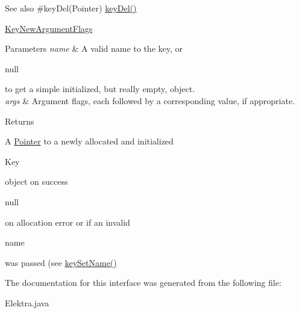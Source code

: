\begin{DoxySeeAlso}{See also}
\#key\+Del(\+Pointer) \hyperlink{group__key_ga3df95bbc2494e3e6703ece5639be5bb1}{key\+Del()} 

\hyperlink{enumorg_1_1libelektra_1_1Elektra_1_1KeyNewArgumentFlags}{Key\+New\+Argument\+Flags}
\end{DoxySeeAlso}

\begin{DoxyParams}{Parameters}
{\em name} & A valid name to the key, or
\begin{DoxyCode}
null 
\end{DoxyCode}
 to get a simple initialized, but really empty, object. \\
\hline
{\em args} & Argument flags, each followed by a corresponding value, if appropriate. \\
\hline
\end{DoxyParams}
\begin{DoxyReturn}{Returns}

\begin{DoxyItemize}
\item A \hyperlink{}{Pointer} to a newly allocated and initialized
\begin{DoxyCode}
Key 
\end{DoxyCode}
 object on success 
\item 
\begin{DoxyCode}
null 
\end{DoxyCode}
 on allocation error or if an invalid
\begin{DoxyCode}
name 
\end{DoxyCode}
 was passed (see \hyperlink{}{key\+Set\+Name()} 
\end{DoxyItemize}
\end{DoxyReturn}


The documentation for this interface was generated from the following file\+:\begin{DoxyCompactItemize}
\item 
Elektra.\+java\end{DoxyCompactItemize}
